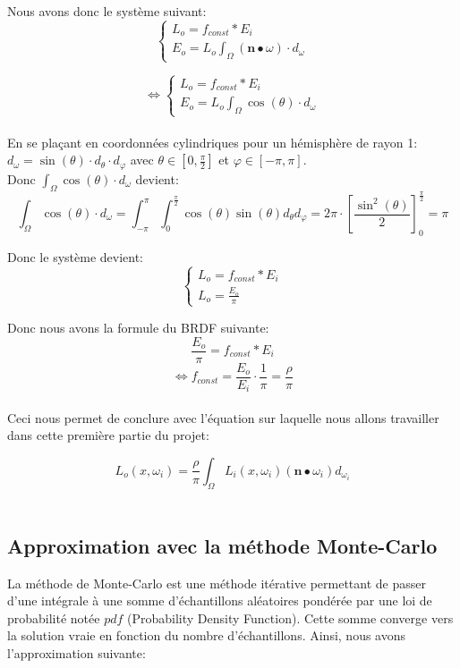 \documentclass{article}
\begin{document}
	 Nous avons donc le système suivant:
	 $$
	 \left\{
		\begin{array}{rcr}
			L_o = f_{const}*E_i \\
			E_o = L_o\int_{\Omega}\left(\textbf{n}\bullet\omega\right)\cdot d_{\omega}
		\end{array}
	\right.
	 $$
	 
	 $$
	 \Leftrightarrow\left\{
		\begin{array}{rcr}
			L_o = f_{const}*E_i \\
			E_o = L_o\int_{\Omega}\cos(\theta)\cdot d_{\omega}
		\end{array}
	\right.
	 $$\\
	 
	 En se plaçant en coordonnées cylindriques pour un hémisphère de rayon 1: $d_\omega = \sin(\theta)\cdot d_\theta\cdot d_\varphi$ avec $\theta\in\left[0,\frac\pi{2}\right]$ et $\varphi\in\left[-\pi,\pi\right]$.\\
	 Donc $\int_{\Omega}\cos(\theta)\cdot d_{\omega}$ devient:
	 $$\int_{\Omega}\cos(\theta)\cdot d_{\omega} = \int_{-\pi}^\pi\int_0^\frac{\pi}{2}\cos(\theta)\sin(\theta)d_\theta d_\varphi=2\pi\cdot\left[\frac{\sin^2(\theta)}{2}\right]_0^\frac{\pi}{2}=\boxed{\pi}$$
	 
	 Donc le système devient:
	 $$
	 \left\{
		\begin{array}{rcr}
			L_o = f_{const}*E_i \\
			L_o = \frac{E_o}{\pi}
		\end{array}
	\right.
	 $$
	 
	 Donc nous avons la formule du BRDF suivante:
	 $$\frac{E_o}{\pi} = f_{const}*E_i$$
	 $$ \Leftrightarrow f_{const} = \frac{E_o}{E_i}\cdot\frac1{\pi} = \boxed{\frac\rho\pi}$$\\
	 
	 
	 Ceci nous permet de conclure avec l'équation sur laquelle nous allons travailler dans cette première partie du projet:
	 
	 $$ 
	 \boxed{L_o\left(x, \omega_i\right) = \frac\rho\pi\int_\Omega L_i\left(x, \omega_i\right)\left(\textbf{n}\bullet\omega_i\right) d_{\omega_i}}
	 $$\\
	 
	 \subsection{Approximation avec la méthode Monte-Carlo}
	 
	 La méthode de Monte-Carlo est une méthode itérative permettant de passer d'une intégrale à une somme d'échantillons aléatoires pondérée par une loi de probabilité notée $pdf$ (Probability Density Function). Cette somme converge vers la solution vraie en fonction du nombre d'échantillons.
	 Ainsi, nous avons l'approximation suivante:\\
	 
\end{document}

